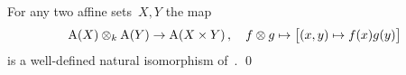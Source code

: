 \begin{proposition}
  \label{regular functions on product of affine sets}
  For any two affine sets~$X,Y$ the map
  \[
            \operatorname{A}(X) \mathbin{\otimes}_k \operatorname{A}(Y)
    \to     \operatorname{A}(X \times Y) \,,
    \quad   f \mathbin{\otimes} g
    \mapsto \big[ (x,y) \mapsto f(x)g(y) \big]
  \]
  is a well-defined natural isomorphism of~.
  \qed
\end{proposition}



% 
% 
% 




